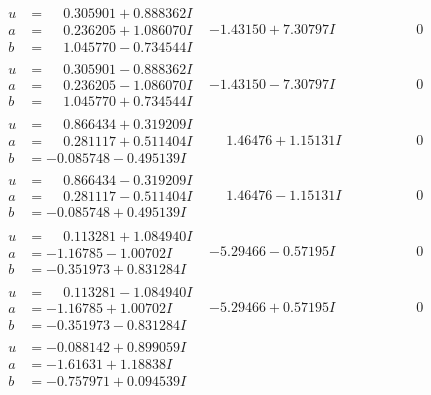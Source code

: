 \documentclass[1p]{elsarticle_modified}
\theoremstyle{definition}
\begin{document}
$$\begin{array}{c|c|c}
\begin{aligned}
u &= \phantom{-}0.305901 + 0.888362 I \\
a &= \phantom{-}0.236205 + 1.086070 I \\
b &= \phantom{-}1.045770 - 0.734544 I\end{aligned}
 & -1.43150 + 7.30797 I & \phantom{-0.000000 } 0 \\ \hline\begin{aligned}
u &= \phantom{-}0.305901 - 0.888362 I \\
a &= \phantom{-}0.236205 - 1.086070 I \\
b &= \phantom{-}1.045770 + 0.734544 I\end{aligned}
 & -1.43150 - 7.30797 I & \phantom{-0.000000 } 0 \\ \hline\begin{aligned}
u &= \phantom{-}0.866434 + 0.319209 I \\
a &= \phantom{-}0.281117 + 0.511404 I \\
b &= -0.085748 - 0.495139 I\end{aligned}
 & \phantom{-}1.46476 + 1.15131 I & \phantom{-0.000000 } 0 \\ \hline\begin{aligned}
u &= \phantom{-}0.866434 - 0.319209 I \\
a &= \phantom{-}0.281117 - 0.511404 I \\
b &= -0.085748 + 0.495139 I\end{aligned}
 & \phantom{-}1.46476 - 1.15131 I & \phantom{-0.000000 } 0 \\ \hline\begin{aligned}
u &= \phantom{-}0.113281 + 1.084940 I \\
a &= -1.16785 - 1.00702 I \\
b &= -0.351973 + 0.831284 I\end{aligned}
 & -5.29466 - 0.57195 I & \phantom{-0.000000 } 0 \\ \hline\begin{aligned}
u &= \phantom{-}0.113281 - 1.084940 I \\
a &= -1.16785 + 1.00702 I \\
b &= -0.351973 - 0.831284 I\end{aligned}
 & -5.29466 + 0.57195 I & \phantom{-0.000000 } 0 \\ \hline\begin{aligned}
u &= -0.088142 + 0.899059 I \\
a &= -1.61631 + 1.18838 I \\
b &= -0.757971 + 0.094539 I\end{aligned}

\end{array}$$
\end{document}
